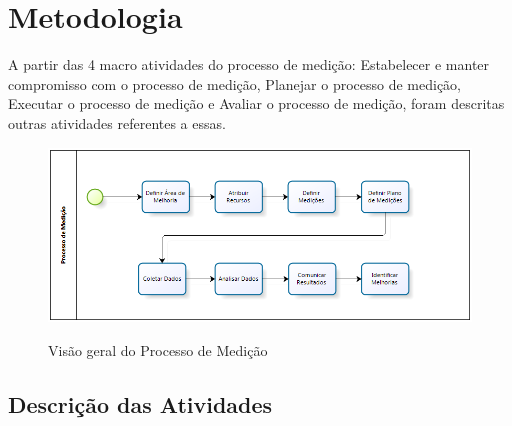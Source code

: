 \chapter{Metodologia}

A partir das 4 macro atividades do processo de medição: Estabelecer e manter compromisso com o processo de medição, Planejar o processo de medição, Executar o processo de medição e Avaliar o processo de medição, foram descritas outras atividades referentes a essas.

\begin{figure}[!htp]
		\centering
		\includegraphics[scale=0.55]{figuras/medicao}
		\label{img:processo}
		\caption{Visão geral do Processo de Medição}
\end{figure}

\section{Descrição das Atividades}

